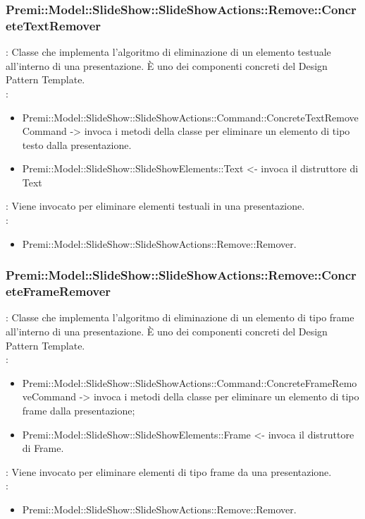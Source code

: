 {	\subsubsection{Premi::Model::SlideShow::SlideShowActions::Remove::ConcreteTextRemover}{
				\textbf{\tipo}: Classe che implementa l'algoritmo di eliminazione di un elemento testuale all’interno di una presentazione.
È uno dei componenti concreti del Design Pattern Template.\\	
				\textbf{\relaz}: 
				\begin{itemize}
					\item Premi::Model::SlideShow::SlideShowActions::Command::ConcreteTextRemoveCommand -> invoca i metodi della classe per eliminare un elemento di tipo testo dalla presentazione.
                    \item Premi::Model::SlideShow::SlideShowElements::Text <- invoca il distruttore di Text
				\end{itemize} 
				\textbf{\interfacce}: Viene invocato per eliminare elementi testuali in una presentazione.\\
                \textbf{\base}: 
                    \begin{itemize}
                    \item Premi::Model::SlideShow::SlideShowActions::Remove::Remover.
                    \end{itemize}
			}
    \subsubsection{Premi::Model::SlideShow::SlideShowActions::Remove::ConcreteFrameRemover}{
				\textbf{\tipo}: Classe che implementa l'algoritmo di eliminazione di un elemento di tipo frame all’interno di una presentazione.
È uno dei componenti concreti del Design Pattern Template.\\	
				\textbf{\relaz}: 
				\begin{itemize}
					\item Premi::Model::SlideShow::SlideShowActions::Command::ConcreteFrameRemoveCommand -> invoca i metodi della classe per eliminare un elemento di tipo frame dalla presentazione;
                    \item Premi::Model::SlideShow::SlideShowElements::Frame <- invoca il distruttore di Frame.
				\end{itemize} 
				\textbf{\interfacce}: Viene invocato per eliminare elementi di tipo frame da una presentazione.\\
                \textbf{\base}: 
                    \begin{itemize}
                    \item Premi::Model::SlideShow::SlideShowActions::Remove::Remover.
                    \end{itemize}
			}
}
